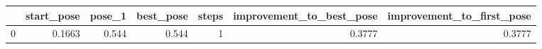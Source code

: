 \begin{tabular}{lrrrrrr}
\toprule
{} &  start\_pose &  pose\_1 &  best\_pose &  steps &  improvement\_to\_best\_pose &  improvement\_to\_first\_pose \\
\midrule
0 &      0.1663 &   0.544 &      0.544 &      1 &                    0.3777 &                     0.3777 \\
\bottomrule
\end{tabular}
